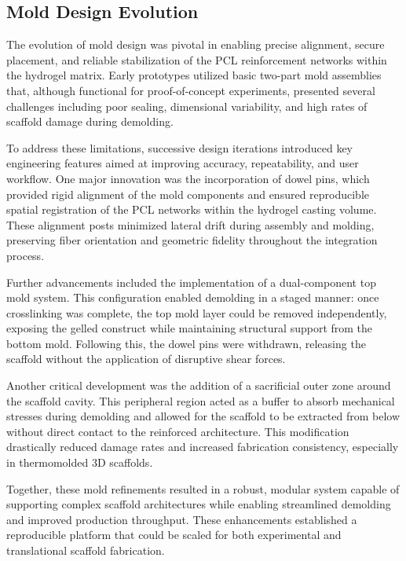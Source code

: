 \subsection{Mold Design Evolution}

The evolution of mold design was pivotal in enabling precise alignment, secure placement, and reliable stabilization of the PCL reinforcement networks within the hydrogel matrix. Early prototypes utilized basic two-part mold assemblies that, although functional for proof-of-concept experiments, presented several challenges including poor sealing, dimensional variability, and high rates of scaffold damage during demolding.

To address these limitations, successive design iterations introduced key engineering features aimed at improving accuracy, repeatability, and user workflow. One major innovation was the incorporation of dowel pins, which provided rigid alignment of the mold components and ensured reproducible spatial registration of the PCL networks within the hydrogel casting volume. These alignment posts minimized lateral drift during assembly and molding, preserving fiber orientation and geometric fidelity throughout the integration process.

Further advancements included the implementation of a dual-component top mold system. This configuration enabled demolding in a staged manner: once crosslinking was complete, the top mold layer could be removed independently, exposing the gelled construct while maintaining structural support from the bottom mold. Following this, the dowel pins were withdrawn, releasing the scaffold without the application of disruptive shear forces.

Another critical development was the addition of a sacrificial outer zone around the scaffold cavity. This peripheral region acted as a buffer to absorb mechanical stresses during demolding and allowed for the scaffold to be extracted from below without direct contact to the reinforced architecture. This modification drastically reduced damage rates and increased fabrication consistency, especially in thermomolded 3D scaffolds.

Together, these mold refinements resulted in a robust, modular system capable of supporting complex scaffold architectures while enabling streamlined demolding and improved production throughput. These enhancements established a reproducible platform that could be scaled for both experimental and translational scaffold fabrication.

